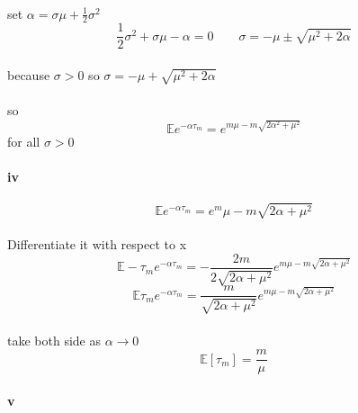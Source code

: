 \documentclass{article}
\begin{document}
\paragraph{}{set $\alpha= \sigma\mu+\frac{1}{2}\sigma^{2}$}
\begin{displaymath}
  \frac{1}{2}\sigma^2+\sigma\mu-\alpha=0\quad\quad \sigma=-\mu \pm \sqrt{\mu^2+2\alpha}
\end{displaymath}
\paragraph{}{because $\sigma >0$ so $\sigma = -\mu +\sqrt{\mu^2+2\alpha}$}
\paragraph{}{so \begin{displaymath}
                  \mathbb{E}e^{-\alpha \tau_{m}}=e^{m\mu-m\sqrt{2\alpha^2+\mu^2}}
                \end{displaymath} for all $\sigma>0$}
\paragraph{iv}{}
\begin{displaymath}
  \mathbb{E}e^{-\alpha\tau_{m}}=e^m\mu-m\sqrt{2\alpha +\mu^2}
\end{displaymath}
\paragraph{}{Differentiate it with respect to x}
\begin{displaymath}
  \mathbb{E}-\tau_{m}e^{-\alpha \tau_{m}}=-\frac{2m}{2\sqrt{2\alpha+\mu^2}}e^{m\mu-m\sqrt{2\alpha+\mu^2}}
\end{displaymath}
\begin{displaymath}
  \mathbb{E}\tau_{m}e^{-\alpha\tau_{m}}=\frac{m}{\sqrt{2\alpha+\mu^2}}e^{m\mu-m\sqrt{2\alpha+\mu^2}}
\end{displaymath}
\paragraph{}{take both side as $\alpha \to 0$}
\begin{displaymath}
  \mathbb{E}[\tau_{m}]=\frac{m}{\mu}
\end{displaymath}
\paragraph{v}{}
\end{document}
